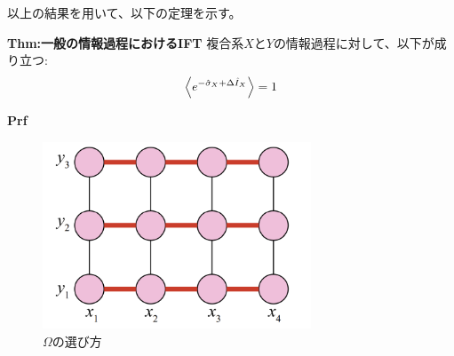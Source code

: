 \documentclass[a4paper,11pt]{jsarticle}
\numberwithin{equation}{section}
\begin{document}
以上の結果を用いて、以下の定理を示す。
\begin{itembox}[l]{\textbf{Thm:一般の情報過程におけるIFT}}
    複合系$X$と$Y$の情報過程に対して、以下が成り立つ:
    \begin{align}
        \ev{e^{-\hat{\sigma}_X + \Delta \hat{I}_X}} = 1
    \end{align}
\end{itembox}
\textbf{Prf}\\

\begin{figure}[H]
    \begin{center}
    \includegraphics[width=80mm]{omega.png}
    \end{center}
    \caption{$\Omega$の選び方}
    \label{fig:omega}
\end{figure}
\end{document}
